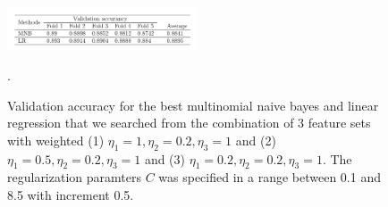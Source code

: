 \documentclass[twoside,twocolumn]{article}
\begin{document}
\begin{figure}[h]
\centering
\includegraphics[width=0.5\textwidth]{Compare.png}
\caption{Validation accuracy for the best multinomial naive bayes and linear regression that we searched from the combination of 3 feature sets with weighted (1) $\eta_1 =1, \eta_2 = 0.2, \eta_3=1$ and (2) $\eta_1 =0.5, \eta_2 = 0.2, \eta_3=1$ and (3) $\eta_1 =0.2, \eta_2 = 0.2, \eta_3=1$. The regularization paramters $C$ was specified in a range between 0.1 and 8.5 with increment 0.5.}.
\label{fig:Fig1}
\end{figure}


\begin{table}[h]
\centering
{}
\caption{ Best performing results for SVM classifier
\label{svm_res}}
\end{table}
\end{document}
